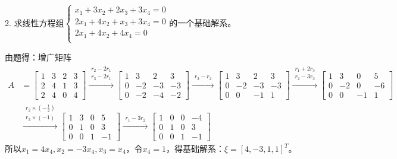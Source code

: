 \documentclass{article}
\begin{document}
2. 求线性方程组$
\begin{cases}
x_{1}+3x_{2}+2x_{3}+3x_{4}=0\\
2x_{1}+4x_{2}+x_{3}+3x_{4}=0\\
2x_{1}+4x_{2}+4x_{4}=0\\
\end{cases}
$的一个基础解系。

\begin{jie}
由题得：增广矩阵
\begin{align*}
A&=
\begin{bmatrix}
1 & 3 & 2 &3\\
2 & 4 & 1 & 3\\
2 & 4 & 0 & 4
\end{bmatrix}
\xrightarrow{\substack{r_{2}-2r_1\\ r_3-2r_1}}
{
\begin{bmatrix}
1 & 3 & 2 &3\\
0 & -2 & -3 & -3\\
0 & -2 & -4 & -2
\end{bmatrix}
}
\xrightarrow{\substack{r_{3}-r_2}}
{
\begin{bmatrix}
1 & 3 & 2 &3\\
0 & -2 & -3 & -3\\
0 & 0 & -1 & 1
\end{bmatrix}
}
\xrightarrow{\substack{r_{1}+2r_3 \\ r_2-3r_3}}
{
\begin{bmatrix}
1 & 3 & 0 & 5\\
0 & -2 & 0 & -6\\
0 & 0 & -1 & 1
\end{bmatrix}
}\\
&
\xrightarrow{\substack{r_{2}\times\left(-\frac{1}{2}\right) \\ r_3\times\left(-1\right)}}
{
\begin{bmatrix}
1 & 3 & 0 & 5\\
0 & 1 & 0 & 3\\
0 & 0 & 1 & -1
\end{bmatrix}
}\xrightarrow{\substack{r_{1}-3r_2}}
{
\begin{bmatrix}
1 & 0 & 0 & -4\\
0 & 1 & 0 & 3\\
0 & 0 & 1 & -1
\end{bmatrix}
}
\end{align*}
所以$x_{1}=4x_4,x_2=-3x_4,x_3=x_4$，令$x_4=1$，得基础解系：$\xi=[4,-3,1,1]^T$。
\end{jie}
\end{document}

